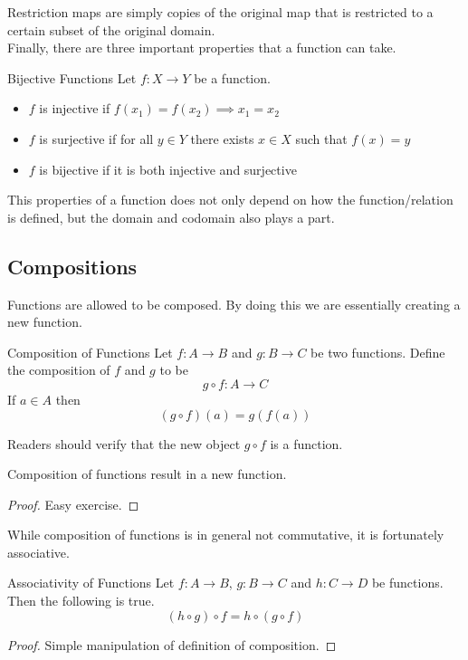 \documentclass[a4paper]{article}
\begin{document}
Restriction maps are simply copies of the original map that is restricted to a certain subset of the original domain. \\

Finally, there are three important properties that a function can take. 

\begin{defn}{Bijective Functions}{} Let $f:X\to Y$ be a function. 
\begin{itemize}
\item $f$ is injective if $f(x_1)=f(x_2)\implies x_1=x_2$
\item $f$ is surjective if for all $y\in Y$ there exists $x\in X$ such that $f(x)=y$
\item $f$ is bijective if it is both injective and surjective
\end{itemize}
\end{defn}

This properties of a function does not only depend on how the function/relation is defined, but the domain and codomain also plays a part. 

\subsection{Compositions}
Functions are allowed to be composed. By doing this we are essentially creating a new function. 
\begin{defn}{Composition of Functions}{} Let $f:A\to B$ and $g:B\to C$ be two functions. Define the composition of $f$ and $g$ to be $$g\circ f:A\to C$$ If $a\in A$ then $$(g\circ f)(a)=g(f(a))$$
\end{defn}

Readers should verify that the new object $g\circ f$ is a function. 

\begin{lmm}{}{} Composition of functions result in a new function. 
\begin{proof}
Easy exercise. 
\end{proof}
\end{lmm}

While composition of functions is in general not commutative, it is fortunately associative. 

\begin{prp}{Associativity of Functions}{} Let $f:A\to B$, $g:B\to C$ and $h:C\to D$ be functions. Then the following is true. $$(h\circ g)\circ f=h\circ(g\circ f)$$
\begin{proof}
Simple manipulation of definition of composition. 
\end{proof}
\end{prp}
\end{document}
